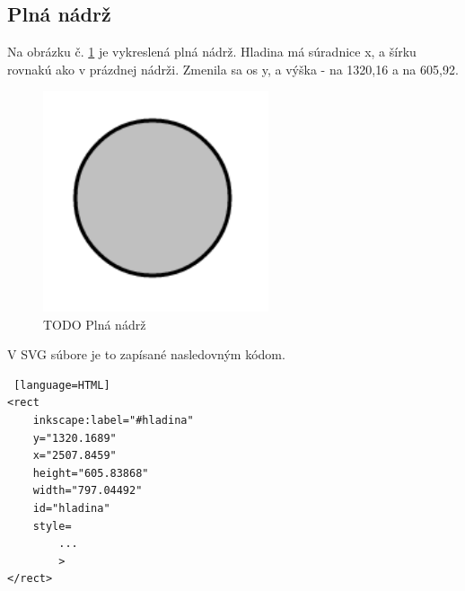 \subsection{Plná nádrž}
Na obrázku č. \ref{picture5} je vykreslená plná nádrž. Hladina má súradnice x, a šírku rovnakú ako v prázdnej nádrži. Zmenila sa os y, a výška - na 1320,16 a na 605,92. 

\begin{figure}[H]
	\begin{center}
		\includegraphics [height=6.5cm]  {obrazky/jednoduchyKruh.png}
		\caption{TODO Plná nádrž}
		\label{picture5}
	\end{center}
\end{figure}

V SVG súbore je to zapísané nasledovným kódom. 


\begin{lstlisting} [language=HTML]
<rect
	inkscape:label="#hladina"
	y="1320.1689"
	x="2507.8459"
	height="605.83868"
	width="797.04492"
	id="hladina"
	style=
		...
        >
</rect>

\end{lstlisting}


%
%
%
%









%










